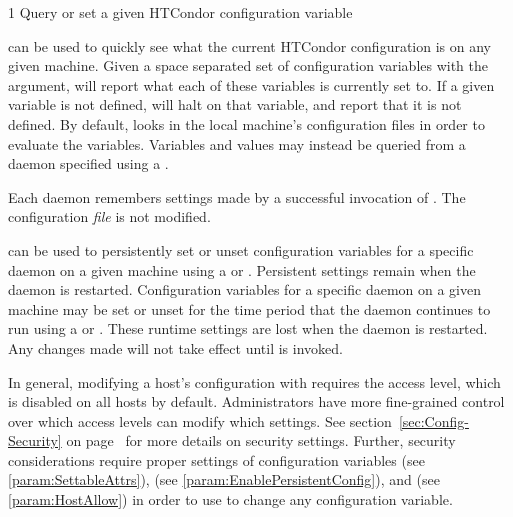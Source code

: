 \begin{ManPage}{\label{man-condor-config-val}}{1}
{Query or set a given HTCondor configuration variable}
\Synopsis {}




\Description

 can be used to quickly see what the current
HTCondor configuration is on any given machine.  
Given a space separated set of
configuration variables with the  argument,
 will report what each of these
variables is currently set to.  If a given variable is not defined,
 will halt on that variable, and report that it is
not defined.  By default,  looks in the local
machine's configuration files in order to evaluate the variables.
Variables and values may instead be queried from a daemon specified
using a .

Each daemon remembers settings made by a successful invocation
of .  
The configuration \emph{file} is not modified.  

 can be used to persistently set or unset 
configuration variables for a specific daemon on a given machine
using a  or  .
Persistent settings remain when the daemon is restarted.  
Configuration variables for a specific daemon on a given machine
may be set or unset for the time period that the daemon continues to run
using a  or  .
These runtime settings are lost when the daemon is restarted.  
Any changes made will not take effect until  is invoked.

In general, modifying a host's configuration with
requires the  access level, which is disabled on all
hosts by default.
Administrators have more
fine-grained control over which access levels can modify which
settings.
See section~\ref{sec:Config-Security} on
page~\pageref{sec:Config-Security} for more details on security settings.
Further, security considerations require proper settings of
configuration variables
 (see \ref{param:SettableAttrs}),
 (see \ref{param:EnablePersistentConfig}),
and  (see \ref{param:HostAllow})
in order to use  to change any configuration variable.


\end{ManPage}
